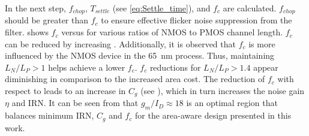 In the next step, $f_{chop}$, $T_{settle}$ (see \cref{eq:Settle_time}), and $f_{c}$ are calculated. $f_{chop}$ should be greater than $f_{c}$ to ensure effective flicker noise suppression from the filter.  shows $f_c$ versus \gmID for various ratios of NMOS to PMOS channel length. $f_c$ can be reduced by increasing \gmID. Additionally, it is observed that $f_c$ is more influenced by the NMOS device in the \SI{65}{\nano\metre} process. Thus, maintaining $L_N/L_P > 1$ helps achieve a lower $f_c$. $f_c$ reductions for $L_N/L_P > 1.4$ appear diminishing in comparison to the increased area cost. The reduction of $f_c$ with respect to \gmID leads to an increase in $C_g$ (see ), which in turn increases the noise gain $\eta$ and IRN. It can be seen from  that $g_m/I_D\approx 18$ is an optimal region that balances minimum IRN, $C_g$ and $f_c$ for the area-aware design presented in this work.  

